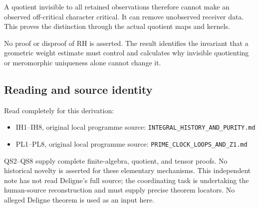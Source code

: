 A quotient invisible to all retained observations therefore cannot make
an observed off-critical character critical. It can remove unobserved
receiver data. This proves the distinction through the actual quotient
maps and kernels.

No proof or disproof of RH is asserted. The result identifies the
invariant that a geometric weight estimate must control and calculates
why invisible quotienting or meromorphic uniqueness alone cannot change
it.

\subsection{Reading and source
identity}\label{reading-and-source-identity}

Read completely for this derivation:

\begin{itemize}
\tightlist
\item
  IH1--IH8, original local programme source:
  \nolinkurl{INTEGRAL_HISTORY_AND_PURITY.md}
\item
  PL1--PL8, original local programme source:
  \nolinkurl{PRIME_CLOCK_LOOPS_AND_Z1.md}
\end{itemize}

QS2--QS8 supply complete finite-algebra, quotient, and tensor proofs. No
historical novelty is asserted for these elementary mechanisms. This
independent note has not read Deligne's full source; the coordinating
task is undertaking the human-source reconstruction and must supply
precise theorem locators. No alleged Deligne theorem is used as an input
here.
